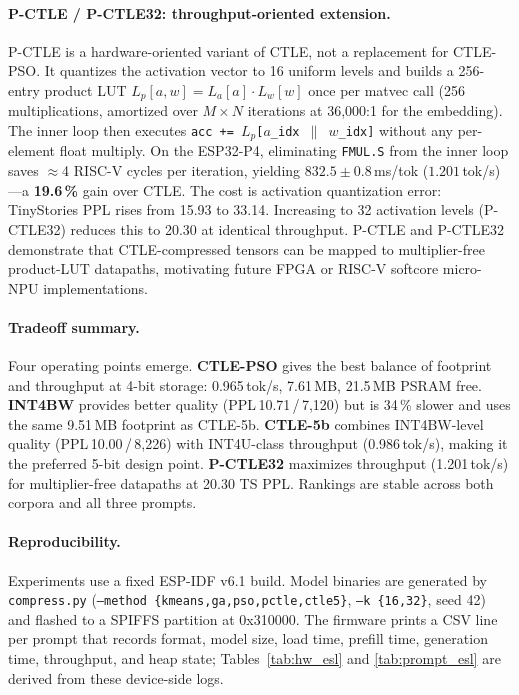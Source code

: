 \documentclass[10pt,journal]{IEEEtran}
\begin{document}
\paragraph{P-CTLE / P-CTLE32: throughput-oriented extension.}
P-CTLE is a hardware-oriented variant of CTLE, not a replacement for CTLE-PSO.
It quantizes the activation vector to 16 uniform levels and builds a 256-entry
product LUT $L_p[a,w]=L_a[a]\cdot L_w[w]$ once per matvec call (256
multiplications, amortized over $M{\times}N$ iterations at 36{,}000:1 for the
embedding). The inner loop then executes \texttt{acc\,+=\,$L_p$[$a$\_idx\,$\|$\,$w$\_idx]}
without any per-element float multiply. On the ESP32-P4, eliminating
\texttt{FMUL.S} from the inner loop saves $\approx$4 RISC-V cycles per
iteration, yielding $\mathbf{832.5\pm0.8}$\,ms/tok ($\mathbf{1.201}$\,tok/s)---a
\textbf{19.6\,\%} gain over CTLE. The cost is activation quantization error:
TinyStories PPL rises from 15.93 to 33.14. Increasing to 32 activation levels
(P-CTLE32) reduces this to 20.30 at identical throughput. P-CTLE and P-CTLE32
demonstrate that CTLE-compressed tensors can be mapped to multiplier-free
product-LUT datapaths, motivating future FPGA or RISC-V softcore micro-NPU
implementations.

\paragraph{Tradeoff summary.}
Four operating points emerge. \textbf{CTLE-PSO} gives the best balance of
footprint and throughput at 4-bit storage: 0.965\,tok/s, 7.61\,MB, 21.5\,MB
PSRAM free. \textbf{INT4BW} provides better quality (PPL\,10.71\,/\,7{,}120)
but is 34\,\% slower and uses the same 9.51\,MB footprint as CTLE-5b.
\textbf{CTLE-5b} combines INT4BW-level quality (PPL\,10.00\,/\,8{,}226) with
INT4U-class throughput (0.986\,tok/s), making it the preferred 5-bit design
point. \textbf{P-CTLE32} maximizes throughput (1.201\,tok/s) for
multiplier-free datapaths at 20.30 TS PPL. Rankings are stable across both
corpora and all three prompts.

\paragraph{Reproducibility.}
Experiments use a fixed ESP-IDF v6.1 build. Model binaries are generated by
\texttt{compress.py} (\texttt{--method \{kmeans,ga,pso,pctle,ctle5\}},
\texttt{--k \{16,32\}}, seed 42) and flashed to a SPIFFS partition at
0x310000. The firmware prints a CSV line per prompt that records format, model
size, load time, prefill time, generation time, throughput, and heap state;
Tables~\ref{tab:hw_esl} and \ref{tab:prompt_esl} are derived from these
device-side logs.
\end{document}
